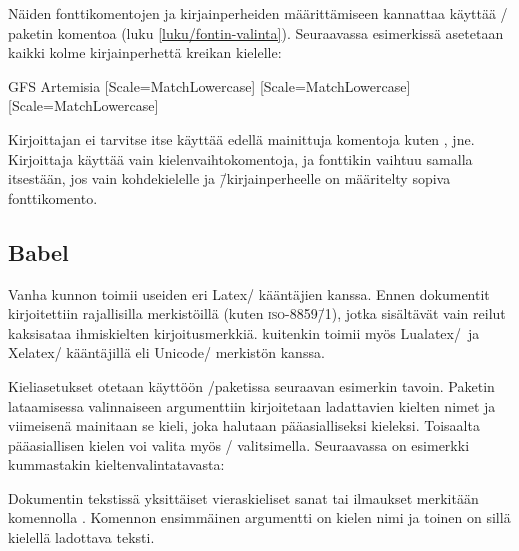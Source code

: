 Näiden fonttikomentojen ja kirjainperheiden määrittämiseen kannattaa
käyttää \-/ paketin komentoa 
(luku \ref{luku/fontin-valinta}). Seuraavassa esimerkissä asetetaan
kaikki kolme kirjainperhettä kreikan kielelle:

\begin{koodilohkosis}
\newfontfamily{\greekfont}  {GFS Artemisia}  [Scale=MatchLowercase]
[Scale=MatchLowercase]
[Scale=MatchLowercase]
\end{koodilohkosis}

\noindent
Kirjoittajan ei tarvitse itse käyttää edellä mainittuja komentoja kuten
,  jne. Kirjoittaja käyttää vain
kielenvaihtokomentoja, ja fonttikin vaihtuu samalla itsestään, jos vain
kohdekielelle ja \=/kirjainperheelle on määritelty sopiva fonttikomento.

\subsection{Babel}
\label{luku/babel}

Vanha kunnon \yipilkku{} toimii
useiden eri Latex\-/ kääntäjien kanssa. Ennen dokumentit kirjoitettiin
rajallisilla merkistöillä (kuten \textsc{iso-8859\=/1}), jotka
sisältävät vain reilut kaksisataa ihmiskielten kirjoitusmerkkiä.
 kuitenkin toimii myös Lualatex\-/\ ja Xelatex\-/
kääntäjillä eli Unicode\-/ merkistön kanssa.

Kieliasetukset otetaan käyttöön \-/paketissa seuraavan
esimerkin tavoin. Paketin lataamisessa valinnaiseen argumenttiin
kirjoitetaan ladattavien kielten nimet ja viimeisenä mainitaan se kieli,
joka halutaan pääasialliseksi kieleksi. Toisaalta pääasiallisen kielen
voi valita myös \-/ valitsimella. Seuraavassa on esimerkki
kummastakin kieltenvalintatavasta:

\begin{koodilohkosis}
\usepackage[english,greek,finnish]{babel}
\usepackage[main=finnish,english,greek]{babel}
\end{koodilohkosis}

\noindent
Dokumentin tekstissä yksittäiset vieraskieliset sanat tai ilmaukset
merkitään komennolla . Komennon ensimmäinen
argumentti on kielen nimi ja toinen on sillä kielellä ladottava teksti.


